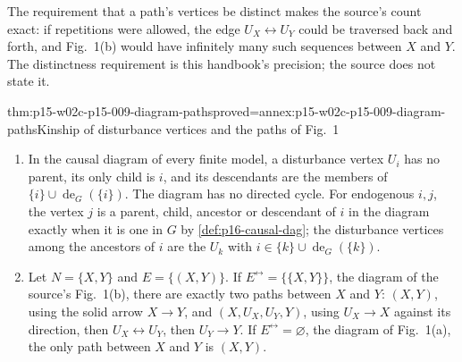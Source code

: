 The requirement that a path's vertices be distinct makes the source's
count exact: if repetitions were allowed, the edge
\(U_X\leftrightarrow U_Y\) could be traversed back and forth, and
Fig.~1(b) would have infinitely many such sequences between \(X\) and
\(Y\). The distinctness requirement is this handbook's precision; the
source does not state it.

\begin{hbtheorem}{thm:p15-w02c-p15-009-diagram-paths}{proved=annex:p15-w02c-p15-009-diagram-paths}{Kinship of disturbance vertices and the paths of Fig.~1}
\begin{enumerate}
\item In the causal diagram of every finite model, a disturbance vertex
      \(U_i\) has no parent, its only child is \(i\), and its descendants
      are the members of \(\{i\}\cup\operatorname{de}_G(\{i\})\). The
      diagram has no directed cycle. For endogenous \(i,j\), the vertex
      \(j\) is a parent, child, ancestor or descendant of \(i\) in the
      diagram exactly when it is one in \(G\) by
      \cref{def:p16-causal-dag}; the disturbance vertices among the
      ancestors of \(i\) are the \(U_k\) with
      \(i\in\{k\}\cup\operatorname{de}_G(\{k\})\).
\item Let \(N=\{X,Y\}\) and \(E=\{(X,Y)\}\). If
      \(E^{\leftrightarrow}=\{\{X,Y\}\}\), the diagram of the source's
      Fig.~1(b), there are exactly two paths between \(X\) and \(Y\):
      \((X,Y)\), using the solid arrow \(X\to Y\), and
      \((X,U_X,U_Y,Y)\), using \(U_X\to X\) against its direction,
      then \(U_X\leftrightarrow U_Y\), then \(U_Y\to Y\). If
      \(E^{\leftrightarrow}=\varnothing\), the diagram of Fig.~1(a), the
      only path between \(X\) and \(Y\) is \((X,Y)\).
\end{enumerate}
\end{hbtheorem}


